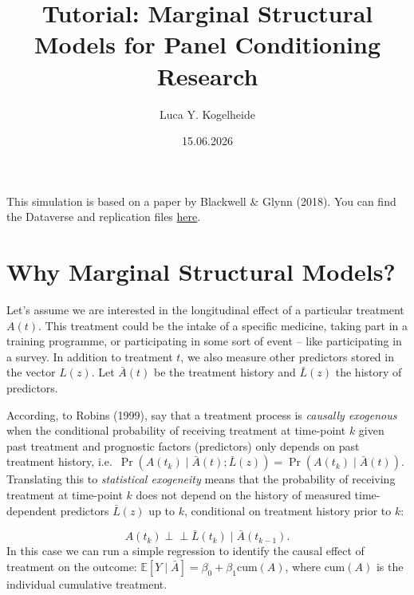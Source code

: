 \documentclass[
  letterpaper,
  DIV=11,
  numbers=noendperiod]{scrartcl}
\title{Tutorial: Marginal Structural Models for Panel Conditioning
Research}
\author{Luca Y. Kogelheide}
\date{15.06.2026}
\begin{document}
\maketitle


This simulation is based on a paper by Blackwell \& Glynn (2018). You
can find the Dataverse and replication files
\href{https://dataverse.harvard.edu/dataset.xhtml?persistentId=doi:10.7910/DVN/SFBX6Z}{here}.

\section{Why Marginal Structural
Models?}\label{why-marginal-structural-models}

Let's assume we are interested in the longitudinal effect of a
particular treatment \(A(t)\). This treatment could be the intake of a
specific medicine, taking part in a training programme, or participating
in some sort of event -- like participating in a survey. In addition to
treatment \(t\), we also measure other predictors stored in the vector
\(L(z)\). Let \(\bar A(t)\) be the treatment history and \(\bar L(z)\)
the history of predictors.

According, to Robins (1999), say that a treatment process is
\emph{causally exogenous} when the conditional probability of receiving
treatment at time-point \(k\) given past treatment and prognostic
factors (predictors) only depends on past treatment history,
i.e.~\(\Pr(A(t_k) \mid \bar A(t); \bar L(z)) = \Pr(A(t_k) \mid \bar A(t))\).
Translating this to \emph{statistical exogeneity} means that the
probability of receiving treatment at time-point \(k\) does not depend
on the history of measured time-dependent predictors \(\bar L(z)\) up to
\(k\), conditional on treatment history prior to \(k\):

\[
A(t_k) \perp \!\!\! \perp \bar L(t_k) \mid \bar A(t_{k-1}).
\] In this case we can run a simple regression to identify the causal
effect of treatment on the outcome:
\(\mathbb{E}[Y \mid \bar A] = \beta_0 + \beta_1 \text{cum}(A)\), where
\(\text{cum}(A)\) is the individual cumulative treatment.
\end{document}
